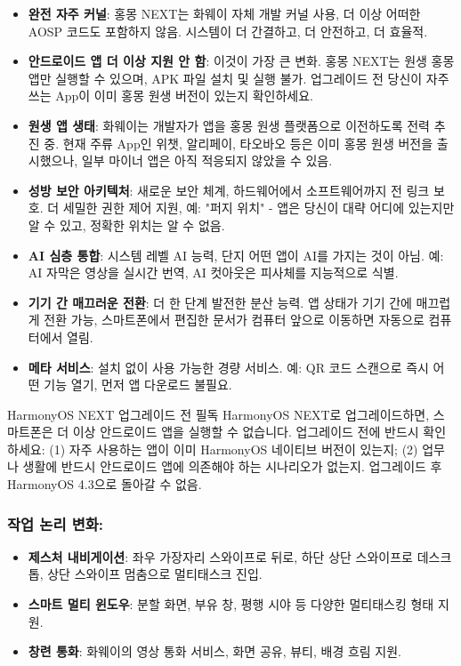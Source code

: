 \begin{itemize}
  \item \textbf{완전 자주 커널}: 홍몽 NEXT는 화웨이 자체 개발 커널 사용, 더 이상 어떠한 AOSP 코드도 포함하지 않음. 시스템이 더 간결하고, 더 안전하고, 더 효율적.
  \item \textbf{안드로이드 앱 더 이상 지원 안 함}: 이것이 가장 큰 변화. 홍몽 NEXT는 원생 홍몽 앱만 실행할 수 있으며, APK 파일 설치 및 실행 불가. 업그레이드 전 당신이 자주 쓰는 App이 이미 홍몽 원생 버전이 있는지 확인하세요.
  \item \textbf{원생 앱 생태}: 화웨이는 개발자가 앱을 홍몽 원생 플랫폼으로 이전하도록 전력 추진 중. 현재 주류 App인 위챗, 알리페이, 타오바오 등은 이미 홍몽 원생 버전을 출시했으나, 일부 마이너 앱은 아직 적응되지 않았을 수 있음.
  \item \textbf{성방 보안 아키텍처}: 새로운 보안 체계, 하드웨어에서 소프트웨어까지 전 링크 보호. 더 세밀한 권한 제어 지원, 예: "퍼지 위치" - 앱은 당신이 대략 어디에 있는지만 알 수 있고, 정확한 위치는 알 수 없음.
  \item \textbf{AI 심층 통합}: 시스템 레벨 AI 능력, 단지 어떤 앱이 AI를 가지는 것이 아님. 예: AI 자막은 영상을 실시간 번역, AI 컷아웃은 피사체를 지능적으로 식별.
  \item \textbf{기기 간 매끄러운 전환}: 더 한 단계 발전한 분산 능력. 앱 상태가 기기 간에 매끄럽게 전환 가능, 스마트폰에서 편집한 문서가 컴퓨터 앞으로 이동하면 자동으로 컴퓨터에서 열림.
  \item \textbf{메타 서비스}: 설치 없이 사용 가능한 경량 서비스. 예: QR 코드 스캔으로 즉시 어떤 기능 열기, 먼저 앱 다운로드 불필요.
\end{itemize}

\begin{tcbwarn}{HarmonyOS NEXT 업그레이드 전 필독}
HarmonyOS NEXT로 업그레이드하면, 스마트폰은 더 이상 안드로이드 앱을 실행할 수 없습니다. 업그레이드 전에 반드시 확인하세요: (1) 자주 사용하는 앱이 이미 HarmonyOS 네이티브 버전이 있는지; (2) 업무나 생활에 반드시 안드로이드 앱에 의존해야 하는 시나리오가 없는지. 업그레이드 후 HarmonyOS 4.3으로 돌아갈 수 없음.

\end{tcbwarn}

\subsubsection*{작업 논리 변화:}

\begin{itemize}
  \item \textbf{제스처 내비게이션}: 좌우 가장자리 스와이프로 뒤로, 하단 상단 스와이프로 데스크톱, 상단 스와이프 멈춤으로 멀티태스크 진입.
  \item \textbf{스마트 멀티 윈도우}: 분할 화면, 부유 창, 평행 시야 등 다양한 멀티태스킹 형태 지원.
  \item \textbf{창련 통화}: 화웨이의 영상 통화 서비스, 화면 공유, 뷰티, 배경 흐림 지원.
\end{itemize}

